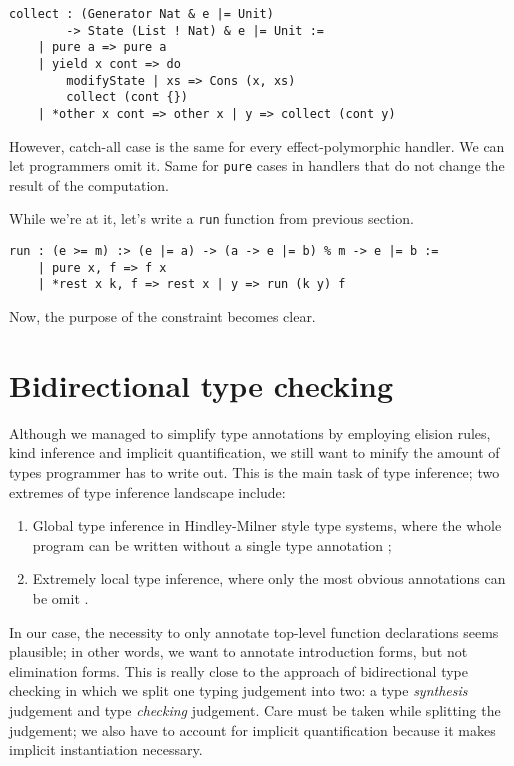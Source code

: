 \documentclass[a4paper,14pt]{extreport}
\begin{document}
\begin{verbatim}
collect : (Generator Nat & e |= Unit)
        -> State (List ! Nat) & e |= Unit :=
    | pure a => pure a
    | yield x cont => do
        modifyState | xs => Cons (x, xs)
        collect (cont {})
    | *other x cont => other x | y => collect (cont y)
\end{verbatim}

However, catch-all case is the same for every effect-polymorphic handler. We can
let programmers omit it. Same for \verb|pure| cases in handlers that do not
change the result of the computation.

While we're at it, let's write a \verb|run| function from previous section.

\begin{verbatim}
run : (e >= m) :> (e |= a) -> (a -> e |= b) % m -> e |= b :=
    | pure x, f => f x
    | *rest x k, f => rest x | y => run (k y) f
\end{verbatim}

Now, the purpose of the constraint becomes clear.

\section{Bidirectional type checking}

Although we managed to simplify type annotations by employing elision rules,
kind inference and implicit quantification, we still want to minify the amount
of types programmer has to write out. This is the main task of type inference;
two extremes of type inference landscape include:

\begin{enumerate}
    \item Global type inference in Hindley-Milner style type systems, where the
        whole program can be written without a single type annotation
        \cite{milner};
    \item Extremely local type inference, where only the most obvious
        annotations can be omit \cite{go}.
\end{enumerate}

In our case, the necessity to only annotate top-level function declarations
seems plausible; in other words, we want to annotate introduction forms, but not
elimination forms. This is really close to the approach of bidirectional type
checking \cite{bidirectional} in which we split one typing judgement into two: a
type \textit{synthesis} judgement and type \textit{checking} judgement. Care
must be taken while splitting the judgement; we also have to account for
implicit quantification because it makes implicit instantiation necessary.
\end{document}
